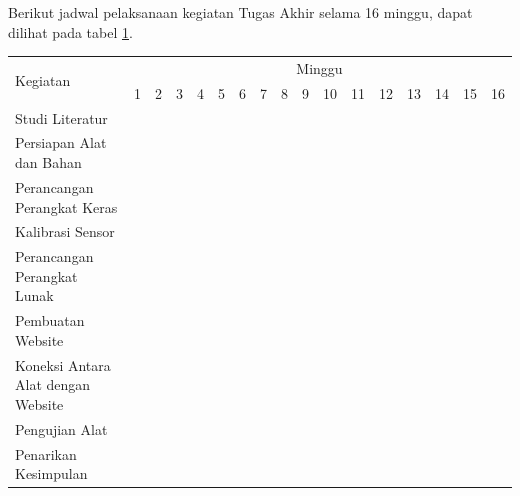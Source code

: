Berikut jadwal pelaksanaan kegiatan Tugas Akhir selama 16 minggu, dapat dilihat pada tabel \ref{tbl:timeline}.
\newcommand{\w}{}
\newcommand{\G}{\cellcolor{gray}}
\begin{table}[h!]
  \begin{tabular}{|p{3.5cm}|c|c|c|c|c|c|c|c|c|c|c|c|c|c|c|c|}

    \hline
    \multirow{2}{*}{Kegiatan} & \multicolumn{16}{|c|}{Minggu} \\
    \cline{2-17} &
    1 & 2 & 3 & 4 & 5 & 6 & 7 & 8 & 9 & 10 & 11 & 12 & 13 & 14 & 15 & 16 \\
    \hline

    Studi Literatur &
    \G & \w & \w & \w & \w & \w & \w & \w & \w & \w & \w & \w & \w & \w & \w & \w \\
    \hline

    Persiapan Alat dan Bahan &
    \w & \G & \G & \w & \w & \w & \w & \w & \w & \w & \w & \w & \w & \w & \w & \w \\
    \hline

    Perancangan Perangkat Keras &
    \w & \w & \w & \G & \G & \w & \w & \w & \w & \w & \w & \w & \w & \w & \w & \w \\
    \hline

    Kalibrasi Sensor &
    \w & \w & \w & \w & \w & \G & \G & \w & \w & \w & \w & \w & \w & \w & \w & \w \\
    \hline

    Perancangan Perangkat Lunak &
    \w & \w & \w & \w & \w & \w & \w & \G & \G & \w & \w & \w & \w & \w & \w & \w \\
    \hline

    Pembuatan Website &
    \w & \w & \w & \w & \w & \w & \w & \w & \w & \G & \G & \w & \w & \w & \w & \w \\
    \hline

    Koneksi Antara Alat dengan Website &
    \w & \w & \w & \w & \w & \w & \w & \w & \w & \w & \w & \G & \w & \w & \w & \w \\
    \hline

    Pengujian Alat &
    \w & \w & \w & \w & \w & \w & \w & \w & \w & \w & \w & \w & \G & \G & \w & \w \\
    \hline

    Penarikan Kesimpulan &
    \w & \w & \w & \w & \w & \w & \w & \w & \w & \w & \w & \w & \w & \w & \G & \G \\
    \hline

  \end{tabular}
  \label{tbl:timeline}
\end{table}

